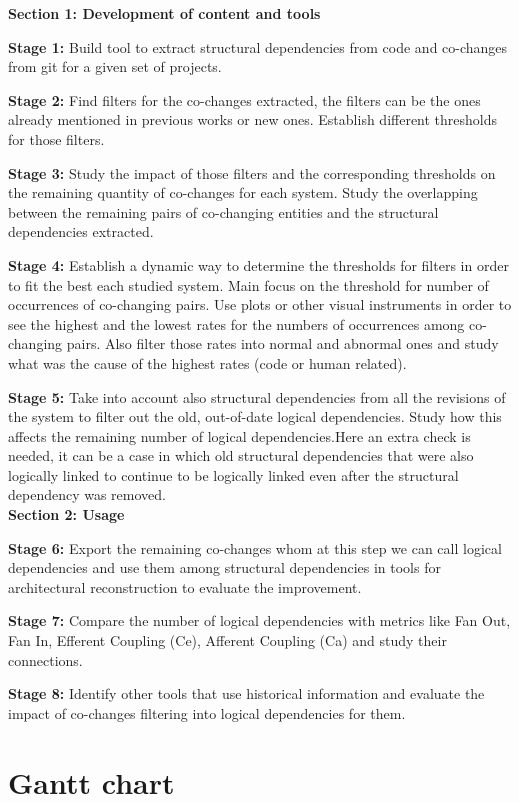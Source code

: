 \documentclass[12pt]{mitthesis}
\begin{document}
\textbf{Section 1:  Development of content and tools}

\textbf{Stage 1:} Build tool to extract structural dependencies from code and co-changes from git for a given set of projects.

\textbf{Stage 2:} Find filters for the co-changes extracted, the filters can be the ones already mentioned in previous works or new ones. Establish different thresholds for those filters.

\textbf{Stage 3:} Study the impact of those filters and the corresponding thresholds on the remaining quantity of co-changes for each system.
Study the overlapping between the remaining pairs of co-changing entities and the structural dependencies extracted. \cite{enase19}

\textbf{Stage 4:} Establish a dynamic way to determine the thresholds for filters in order to fit the best each studied system. Main focus on the threshold for number of occurrences of co-changing pairs.
Use plots or other visual instruments in order to see the highest and the lowest rates for the numbers of occurrences among co-changing pairs.
Also filter those rates into normal and abnormal ones and study what was the cause of the highest rates (code or human related).

\textbf{Stage 5:} Take into account also structural dependencies from all the revisions of the system to filter out the old, out-of-date logical dependencies. 
Study how this affects the remaining number of logical dependencies.Here an extra check is needed, it can be a case in which old structural dependencies that were also logically linked to continue to be logically linked
even after the structural dependency was removed.\\


\textbf{Section 2: Usage}

\textbf{Stage 6:} Export the remaining co-changes whom at this step we can call logical dependencies and use them among structural dependencies in tools for architectural reconstruction to evaluate the improvement.

\textbf{Stage 7:} Compare the number of logical dependencies with metrics like Fan Out, Fan In, Efferent Coupling (Ce), Afferent Coupling (Ca) and study their connections.

\textbf{Stage 8:} Identify other tools that use historical information and evaluate the impact of co-changes filtering into logical dependencies for them. 

\section{Gantt chart}
\end{document}
